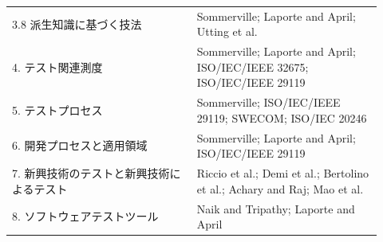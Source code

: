 \documentclass[a4paper,11pt]{ltjsarticle}
\numberwithin{figure}{section}
\numberwithin{table}{section}
\begin{document}
\begin{longtable}{P{0.46\linewidth}P{0.46\linewidth}}
3.8 派生知識に基づく技法 & Sommerville; Laporte and April; Utting et al. \\
4. テスト関連測度 & Sommerville; Laporte and April; ISO/IEC/IEEE 32675; ISO/IEC/IEEE 29119 \\
5. テストプロセス & Sommerville; ISO/IEC/IEEE 29119; SWECOM; ISO/IEC 20246 \\
6. 開発プロセスと適用領域 & Sommerville; Laporte and April; ISO/IEC/IEEE 29119 \\
7. 新興技術のテストと新興技術によるテスト & Riccio et al.; Demi et al.; Bertolino et al.; Achary and Raj; Mao et al. \\
8. ソフトウェアテストツール & Naik and Tripathy; Laporte and April \\
\bottomrule
\end{longtable}
\end{document}

